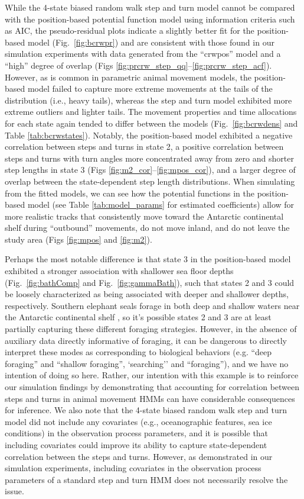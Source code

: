 \documentclass[12pt]{article}\usepackage[]{graphicx}\usepackage[]{xcolor}
\begin{document}
While the 4-state biased random walk step and turn model cannot be compared with the position-based potential function model using information criteria such as AIC, the pseudo-residual plots indicate a slightly better fit for the position-based model (Fig.\ \ref{fig:bcrwpr}) and are consistent with those found in our simulation experiments with data generated from the ``crwpos'' model and a ``high'' degree of overlap (Figs \ref{fig:prcrw_step_qq}--\ref{fig:prcrw_step_acf}). However, as is common in parametric animal movement models, the position-based model failed to capture more extreme movements at the tails of the distribution (i.e., heavy tails), whereas the step and turn model exhibited more extreme outliers and lighter tails. The movement properties and time allocations for each state again tended to differ between the models (Fig.\ \ref{fig:bcrwdens} and Table \ref{tab:bcrwstates}). Notably, the position-based model exhibited a negative correlation between steps and turns in state 2, a positive correlation between steps and turns with turn angles more concentrated away from zero and shorter step lengths in state 3 (Figs \ref{fig:m2_cor}--\ref{fig:mpos_cor}), and a larger degree of overlap between the state-dependent step length distributions. When simulating from the fitted models, we can see how the potential functions in the position-based model (see Table \ref{tab:model_params} for estimated coefficients) allow for more realistic tracks that consistently move toward the Antarctic continental shelf during ``outbound'' movements, do not move inland, and do not leave the study area (Figs \ref{fig:mpos} and \ref{fig:m2}).

Perhaps the most notable difference is that state 3 in the position-based model exhibited a stronger association with shallower sea floor depths (Fig.\ \ref{fig:bathComp} and Fig.\ \ref{fig:gammaBath}), such that states 2 and 3 could be loosely characterized as being associated with deeper and shallower depths, respectively. Southern elephant seals forage in both deep and shallow waters near the Antarctic continental shelf \citep[e.g.][]{mcconnell1992foraging}, so it's possible states 2 and 3 are at least partially capturing these different foraging strategies. However, in the absence of auxiliary data directly informative of foraging, it can be dangerous to directly interpret these modes as corresponding to biological behaviors (e.g. ``deep foraging'' and ``shallow foraging'', `searching'' and ``foraging''), and we have no intention of doing so here. Rather, our intention with this example is to reinforce our simulation findings by demonstrating that accounting for correlation between steps and turns in animal movement HMMs can have considerable consequences for inference. We also note that the 4-state biased random walk step and turn model did not include any covariates (e.g., oceanographic features, sea ice conditions) in the observation process parameters, and it is possible that including covariates could improve its ability to capture state-dependent correlation between the steps and turns. However, as demonstrated in our simulation experiments, including covariates in the observation process parameters of a standard step and turn HMM does not necessarily resolve the issue.
\end{document}
